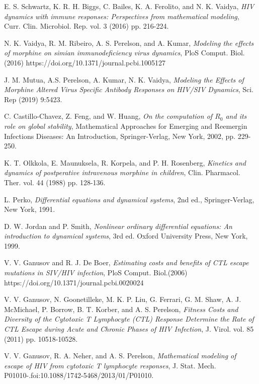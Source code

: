 \documentclass[11pt, oneside]{article}    %
\begin{document}
\begin{thebibliography}{99}
E. S. Schwartz, K. R. H. Biggs, C. Bailes, K. A. Ferolito, and N. K. Vaidya, {\em HIV dynamics with immune responses: Perspectives from mathematical modeling}, Curr. Clin. Microbiol. Rep. vol. 3 (2016) pp. 216-224.

N. K. Vaidya, R. M. Ribeiro, A. S. Perelson, and A. Kumar,  {\em Modeling the effects of morphine on simian immunodeficiency virus dynamics}, PloS Comput. Biol. (2016) https://doi.org/10.1371/journal.pcbi.1005127

J. M. Mutua, A.S. Perelson, A. Kumar, N. K. Vaidya, {\em Modeling the Effects of Morphine Altered Virus Specific Antibody Responses on HIV/SIV Dynamics}, Sci. Rep (2019) 9:5423.

C. Castillo-Chavez, Z. Feng, and W. Huang,  {\em On the computation of $R_0$ and its role on global stability}, Mathematical Approaches for Emerging and Reemergin Infections Diseases: An Introduction, Springer-Verlag, New York, 2002, pp. 229-250.

K. T. Olkkola, E. Maunuksela, R. Korpela, and P. H. Rosenberg,  {\em Kinetics and dynamics of postperative intravenous morphine in children}, Clin. Pharmacol. Ther. vol. 44 (1988) pp. 128-136.

L. Perko, {\em Differential equations and dynamical systems}, 2nd ed., Springer-Verlag, New York, 1991.

D. W. Jordan and P. Smith,  {\em Nonlinear ordinary differential equations: An introduction to dynamical systems}, 3rd ed. Oxford University Press, New York, 1999.

V. V. Ganusov and R. J. De Boer, {\em Estimating costs and benefits of CTL escape mutations in SIV/HIV infection}, PloS Comput. Biol.(2006) https://doi.org/10.1371/journal.pcbi.0020024

V. V. Ganusov, N. Goonetilleke, M. K. P. Liu, G. Ferrari, G. M. Shaw, A. J. McMichael, P. Borrow, B. T. Korber, and A. S. Perelson, {\em Fitness Costs and Diversity of the Cytotoxic T Lymphocyte (CTL) Response Determine the Rate of CTL Escape during Acute and Chronic Phases of HIV Infection}, J. Virol. vol. 85 (2011) pp. 10518-10528.

V. V. Ganusov, R. A. Neher, and A. S. Perelson, {\em Mathematical modeling of escape of HIV from cytotoxic T lymphocyte responses}, J. Stat. Mech. P01010-.foi:10.1088/1742-5468/2013/01/P01010.


\end{thebibliography}
\end{document}
